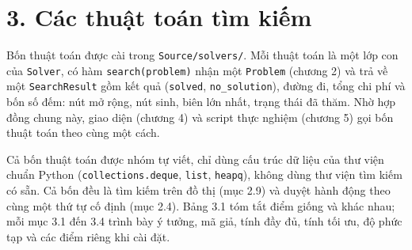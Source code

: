 \section{3. Các thuật toán tìm kiếm}

Bốn thuật toán được cài trong \texttt{Source/\allowbreak{}solvers/\allowbreak{}}. Mỗi thuật toán là một lớp con của \texttt{Solver}, có hàm \texttt{search(problem)} nhận một \texttt{Problem} (chương 2) và trả về một \texttt{SearchResult} gồm kết quả (\texttt{solved}, \texttt{no\_\allowbreak{}solution}), đường đi, tổng chi phí và bốn số đếm: nút mở rộng, nút sinh, biên lớn nhất, trạng thái đã thăm. Nhờ hợp đồng chung này, giao diện (chương 4) và script thực nghiệm (chương 5) gọi bốn thuật toán theo cùng một cách.

Cả bốn thuật toán được nhóm tự viết, chỉ dùng cấu trúc dữ liệu của thư viện chuẩn Python (\texttt{collections.\allowbreak{}deque}, \texttt{list}, \texttt{heapq}), không dùng thư viện tìm kiếm có sẵn. Cả bốn đều là tìm kiếm trên đồ thị (mục 2.9) và duyệt hành động theo cùng một thứ tự cố định (mục 2.4). Bảng 3.1 tóm tắt điểm giống và khác nhau; mỗi mục 3.1 đến 3.4 trình bày ý tưởng, mã giả, tính đầy đủ, tính tối ưu, độ phức tạp và các điểm riêng khi cài đặt.


